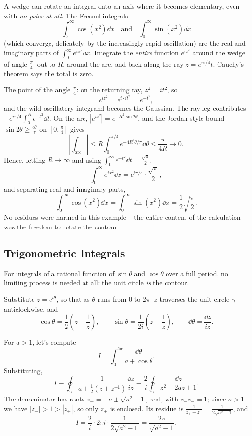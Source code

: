 \documentclass[a4paper]{scrartcl}
\begin{document}
\begin{example}
	A wedge can rotate an integral onto an axis where it becomes elementary, even with \emph{no poles at all}. The Fresnel integrals
	$$
	\int_0^\infty \cos(x^2) \dd x \quad \text{and} \quad \int_0^\infty \sin(x^2) \dd x
	$$
	(which converge, delicately, by the increasingly rapid oscillation) are the real and imaginary parts of $\int_0^\infty e^{ix^2} \dd x$. Integrate the \emph{entire} function $e^{iz^2}$ around the wedge of angle $\frac{\pi}{4}$: out to $R$, around the arc, and back along the ray $z = e^{i\pi/4} t$. Cauchy's theorem says the total is zero.

	The point of the angle $\frac \pi 4$: on the returning ray, $z^2 = it^2$, so
	$$
	e^{iz^2} = e^{i \cdot it^2} = e^{-t^2},
	$$
	and the wild oscillatory integrand becomes the Gaussian. The ray leg contributes $-e^{i\pi/4}\int_0^R e^{-t^2} \dd t$. On the arc, $|e^{iz^2}| = e^{-R^2 \sin 2\theta}$, and the Jordan-style bound $\sin 2\theta \geq \frac{4\theta}{\pi}$ on $[0, \frac \pi 4]$ gives
	$$
	\left|\int_{\text{arc}}\right| \leq R \int_0^{\pi/4} e^{-4R^2 \theta/\pi} \dd \theta \leq \frac{\pi}{4R} \to 0.
	$$
	Hence, letting $R \to \infty$ and using $\int_0^\infty e^{-t^2} \dd t = \frac{\sqrt \pi}{2}$,
	$$
	\int_0^\infty e^{ix^2} \dd x = e^{i\pi/4} \cdot \frac{\sqrt\pi}{2},
	$$
	and separating real and imaginary parts,
	$$
	\int_0^\infty \cos(x^2) \dd x = \int_0^\infty \sin(x^2) \dd x = \frac 12 \sqrt{\frac{\pi}{2}}.
	$$
	No residues were harmed in this example -- the entire content of the calculation was the freedom to rotate the contour.
\end{example}

\subsection{Trigonometric Integrals}

For integrals of a rational function of $\sin\theta$ and $\cos\theta$ over a full period, no limiting process is needed at all: the unit circle \emph{is} the contour.

Substitute $z = e^{i\theta}$, so that as $\theta$ runs from $0$ to $2\pi$, $z$ traverses the unit circle $\gamma$ anticlockwise, and
$$
\cos \theta = \frac{1}{2}\left(z + \frac 1z\right), \qquad \sin\theta = \frac{1}{2i}\left(z - \frac 1z\right), \qquad \dd \theta = \frac{\dd z}{iz}.
$$

\begin{example}
	For $a > 1$, let's compute
	$$
	I = \int_0^{2\pi} \frac{\dd \theta}{a + \cos\theta}.
	$$
	Substituting,
	$$
	I = \oint_\gamma \frac{1}{a + \frac 12 (z + z^{-1})} \frac{\dd z}{iz} = \frac{2}{i}\oint_\gamma \frac{\dd z}{z^2 + 2az + 1}.
	$$
	The denominator has roots $z_\pm = -a \pm \sqrt{a^2 - 1}$, real, with $z_+ z_- = 1$; since $a > 1$ we have $|z_-| > 1 > |z_+|$, so only $z_+$ is enclosed. Its residue is $\frac{1}{z_+ - z_-} = \frac{1}{2\sqrt{a^2 - 1}}$, and
	$$
	I = \frac{2}{i} \cdot 2\pi i \cdot \frac{1}{2\sqrt{a^2 - 1}} = \frac{2\pi}{\sqrt{a^2 - 1}}.
	$$
\end{example}
\end{document}
